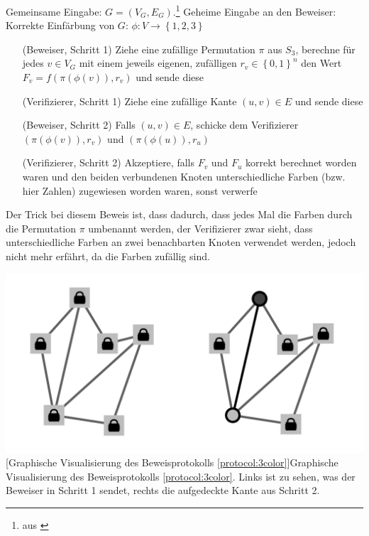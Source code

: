 \begin{protocol}
\label{protocol:3color}
Gemeinsame Eingabe: \( G = \left( V_G, E_G \right) \).\footnote{aus \cite[Protocol 4]{np}}
Geheime Eingabe an den Beweiser: Korrekte Einfärbung von \( G \): \( \phi : V \rightarrow \left\lbrace 1, 2, 3\right\rbrace \)
\begin{itemize}
\item[(Beweiser, Schritt 1)] Ziehe eine zufällige Permutation \( \pi \) aus \( S_3 \), berechne für jedes \( v \in V_G \) mit einem jeweils eigenen, zufälligen \( r_v \in \left\lbrace 0, 1\right\rbrace ^n \) den Wert \( F_v = f \left( \pi \left( \phi \left( v \right) \right), r_v \right) \) und sende diese
\item[(Verifizierer, Schritt 1)] Ziehe eine zufällige Kante \( \left( u, v \right) \in E \) und sende diese
\item[(Beweiser, Schritt 2)] Falls \( \left( u, v \right) \in E \), schicke dem Verifizierer \( \left( \pi \left( \phi \left( v \right) \right), r_v \right) \) und \( \left( \pi \left( \phi \left( u \right) \right), r_u \right) \)
\item[(Verifizierer, Schritt 2)] Akzeptiere, falls \( F_v \) und \( F_u \) korrekt berechnet worden waren und den beiden verbundenen Knoten unterschiedliche Farben (bzw. hier Zahlen) zugewiesen worden waren, sonst verwerfe
\end{itemize}
\end{protocol}

Der Trick bei diesem Beweis ist, dass dadurch, dass jedes Mal die Farben durch die Permutation \( \pi \) umbenannt werden, der Verifizierer zwar sieht, dass unterschiedliche Farben an zwei benachbarten Knoten verwendet werden, jedoch nicht mehr erfährt, da die Farben zufällig sind.

\vspace{1em}
\begin{minipage}{\linewidth}
	\centering
	\includegraphics[width=0.7\linewidth]{img/3colorgraphs-proof.pdf}
	[Graphische Visualisierung des Beweisprotokolls \ref{protocol:3color}]{Graphische Visualisierung des Beweisprotokolls \ref{protocol:3color}. Links ist zu sehen, was der Beweiser in Schritt 1 sendet, rechts die aufgedeckte Kante aus Schritt 2.}
	\label{fig:3coloringproof}
\end{minipage}

